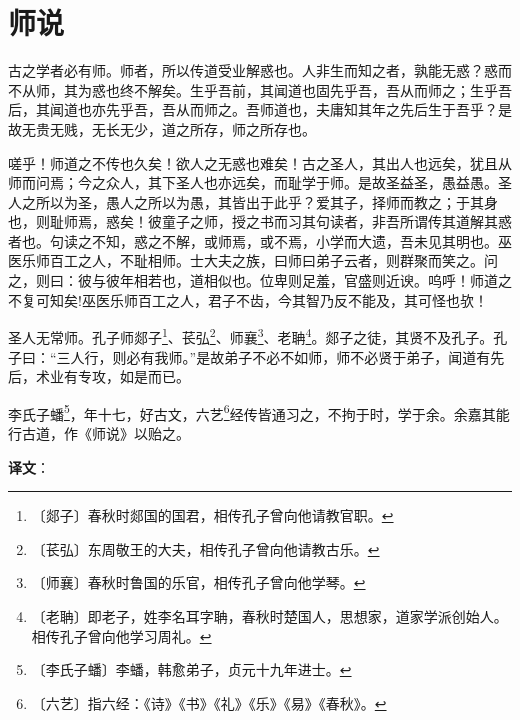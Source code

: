 \documentclass[12pt,UTF-8,openany,a4]{ctexbook}
\begin{document}
\chapter{师说}

\begin{large}
    
    古之学者必有师。师者，所以传道受业解惑也。人非生而知之者，孰能无惑？惑而不从师，其为惑也终不解矣。生乎吾前，其闻道也固先乎吾，吾从而师之；生乎吾后，其闻道也亦先乎吾，吾从而师之。吾师道也，夫庸知其年之先后生于吾乎？是故无贵无贱，无长无少，道之所存，师之所存也。
    
    嗟乎！师道之不传也久矣！欲人之无惑也难矣！古之圣人，其出人也远矣，犹且从师而问焉；今之众人，其下圣人也亦远矣，而耻学于师。是故圣益圣，愚益愚。圣人之所以为圣，愚人之所以为愚，其皆出于此乎？爱其子，择师而教之；于其身也，则耻师焉，惑矣！彼童子之师，授之书而习其句读者，非吾所谓传其道解其惑者也。句读之不知，惑之不解，或师焉，或不焉，小学而大遗，吾未见其明也。巫医乐师百工之人，不耻相师。士大夫之族，曰师曰弟子云者，则群聚而笑之。问之，则曰：彼与彼年相若也，道相似也。位卑则足羞，官盛则近谀。呜呼！师道之不复可知矣!巫医乐师百工之人，君子不齿，今其智乃反不能及，其可怪也欤！
    
    圣人无常师。孔子师郯子\footnote{〔郯子〕\yiwen 春秋时郯国的国君，相传孔子曾向他请教官职。}、苌弘\footnote{〔苌弘〕\yiwen 东周敬王的大夫，相传孔子曾向他请教古乐。}、师襄\footnote{〔师襄〕\yiwen 春秋时鲁国的乐官，相传孔子曾向他学琴。}、老聃\footnote{〔老聃〕\yiwen 即老子，姓李名耳字聃，春秋时楚国人，思想家，道家学派创始人。相传孔子曾向他学习周礼。}。郯子之徒，其贤不及孔子。孔子曰：“三人行，则必有我师。”是故弟子不必不如师，师不必贤于弟子，闻道有先后，术业有专攻，如是而已。
    
    李氏子蟠\footnote{〔李氏子蟠〕\yiwen 李蟠，韩愈弟子，贞元十九年进士。}，年十七，好古文，六艺\footnote{〔六艺〕\yiwen 指六经：《诗》《书》《礼》《乐》《易》《春秋》。}经传皆通习之，不拘于时，学于余。余嘉其能行古道，作《师说》以贻之。

\end{large}


\newpage

\begin{Large}
   \noindent \textbf{译文}：
\end{Large}

\vspace{1em}
\end{document}
